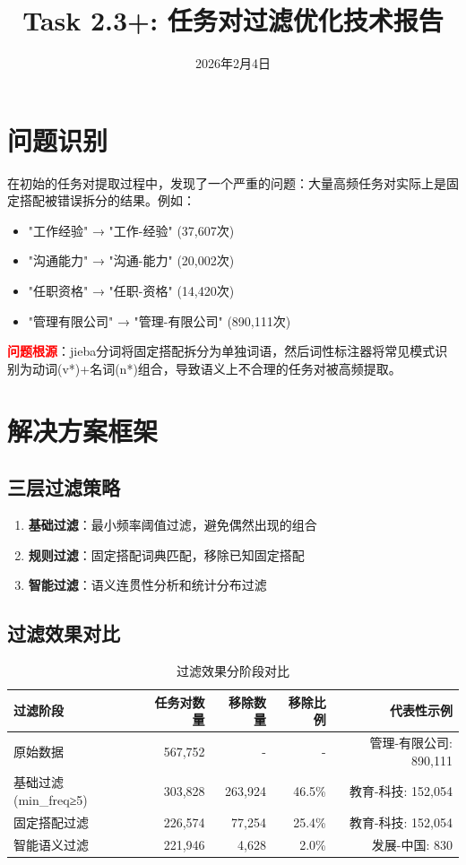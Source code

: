 \documentclass[11pt,a4paper]{article}
\title{\textbf{Task 2.3+: 任务对过滤优化技术报告}}
\date{2026年2月4日}
\begin{document}
\maketitle

\section{问题识别}

在初始的任务对提取过程中，发现了一个严重的问题：大量高频任务对实际上是固定搭配被错误拆分的结果。例如：

\begin{itemize}
    \item "工作经验" → "工作-经验" (37,607次)
    \item "沟通能力" → "沟通-能力" (20,002次)
    \item "任职资格" → "任职-资格" (14,420次)
    \item "管理有限公司" → "管理-有限公司" (890,111次)
\end{itemize}

\textcolor{red}{\textbf{问题根源}}：jieba分词将固定搭配拆分为单独词语，然后词性标注器将常见模式识别为动词(v*)+名词(n*)组合，导致语义上不合理的任务对被高频提取。

\section{解决方案框架}

\subsection{三层过滤策略}

\begin{enumerate}
    \item \textbf{基础过滤}：最小频率阈值过滤，避免偶然出现的组合
    \item \textbf{规则过滤}：固定搭配词典匹配，移除已知固定搭配
    \item \textbf{智能过滤}：语义连贯性分析和统计分布过滤
\end{enumerate}

\subsection{过滤效果对比}

\begin{table}[h]
\centering
\begin{tabular}{lrrrr}
\toprule
\textbf{过滤阶段} & \textbf{任务对数量} & \textbf{移除数量} & \textbf{移除比例} & \textbf{代表性示例} \\
\midrule
原始数据 & 567,752 & - & - & 管理-有限公司: 890,111 \\
基础过滤 (min\_freq≥5) & 303,828 & 263,924 & 46.5\% & 教育-科技: 152,054 \\
固定搭配过滤 & 226,574 & 77,254 & 25.4\% & 教育-科技: 152,054 \\
智能语义过滤 & 221,946 & 4,628 & 2.0\% & 发展-中国: 830 \\
\bottomrule
\end{tabular}
\caption{过滤效果分阶段对比}
\end{table}
\end{document}
